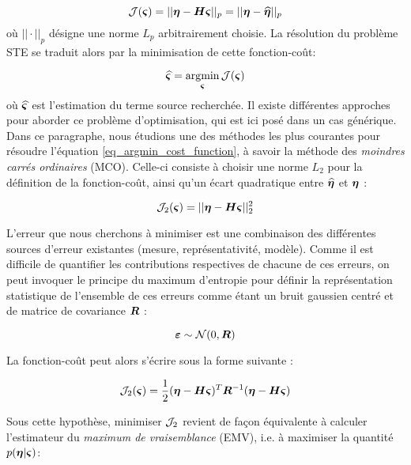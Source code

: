 \begin{equation}
{\mathcal{J}}({\bm{\varsigma}}) = ||{\bm{\eta}} - {\bm{H}} {\bm{\varsigma}}||_p = ||{\bm{\eta}}- \widehat{{\bm{\eta}}}||_p
\label{eq_cost_function_definition}
\end{equation}
où $||\cdot||_p$ désigne une norme $L_p$ arbitrairement choisie. La résolution du problème STE se traduit alors par la minimisation de cette fonction-coût:

\begin{equation}
\widehat{{\bm{\varsigma}}} = \operatorname*{\arg\!\min}_{\bm{\varsigma}} \mathcal{J}({\bm{\varsigma}})
\label{eq_argmin_cost_function}
\end{equation}
où $\widehat{{\bm{\varsigma}}}$ est l'estimation du terme source recherchée. Il existe différentes approches  pour aborder ce problème d'optimisation, qui est ici posé dans un cas générique. Dans ce paragraphe, nous étudions une des méthodes les plus courantes pour résoudre l'équation \eqref{eq_argmin_cost_function}, à savoir la méthode des \textit{moindres carrés ordinaires} (MCO). Celle-ci consiste à choisir une norme $L_2$ pour la définition de la fonction-coût, ainsi qu'un écart quadratique entre $\widehat{{\bm{\eta}}}$ et ${\bm{\eta}}$ : 

\begin{equation}
{\mathcal{J}}_{2}({\bm{\varsigma}}) = ||{\bm{\eta}} - {\bm{H}} {\bm{\varsigma}} ||_2^2
\label{eq_cost_MCO}
\end{equation}

L'erreur que nous cherchons à minimiser est une combinaison des différentes sources d'erreur existantes (mesure, représentativité, modèle). Comme il est difficile de quantifier les contributions respectives de chacune de ces erreurs, on peut invoquer le principe du maximum d'entropie pour définir la représentation statistique de l'ensemble de ces erreurs comme étant un bruit gaussien centré et de matrice de covariance ${\bm{R}}$ : 

\begin{equation}
{\bm{\varepsilon}} \sim \mathcal{N}(0,{\bm{R}})
\label{eq_bruit_obs}
\end{equation}

La fonction-coût peut alors s'écrire sous la forme suivante \cite{Winiarek2011}:

\begin{equation}
\mathcal{J}_2({\bm{\varsigma}}) = \dfrac{1}{2}({\bm{\eta}} - {\bm{H}} {\bm{\varsigma}})^T {\bm{R}}^{-1}({\bm{\eta}} - {\bm{H}}{\bm{\varsigma}})
\label{eq_cost_forme2}
\end{equation}

Sous cette hypothèse, minimiser ${\mathcal{J}}_2$ revient de façon équivalente à calculer l'estimateur du \textit{maximum de vraisemblance} (EMV), i.e. à maximiser la quantité $p({\bm{\eta}} | {\bm{\varsigma}})$: 

